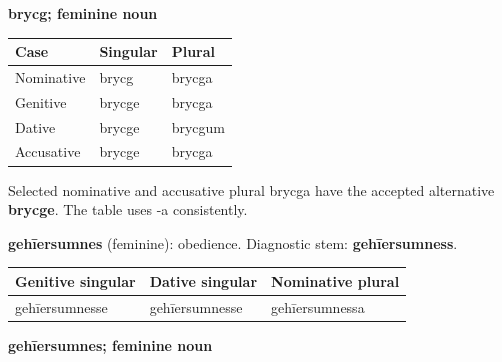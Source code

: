 \textbf{brycg; feminine noun}

\par\begingroup
\fontsize{10.5}{13.2}\selectfont
\setlength{\LTleft}{0pt}\setlength{\LTright}{\fill}
\noindent
\begin{tabular}{@{}>{\raggedright\arraybackslash}p{39.46mm}>{\raggedright\arraybackslash}p{39.46mm}>{\raggedright\arraybackslash}p{39.46mm}@{}}
\toprule
\textbf{Case} & \textbf{Singular} & \textbf{Plural} \\
\midrule
Nominative & brycg & brycga \\
Genitive & brycge & brycga \\
Dative & brycge & brycgum \\
Accusative & brycge & brycga \\
\bottomrule
\end{tabular}
\par\endgroup

Selected nominative and accusative plural brycga have the accepted alternative \textbf{brycge}. The table uses -a consistently.

\textbf{gehīersumnes} (feminine): obedience. Diagnostic stem: \textbf{gehīersumness}.

\par\begingroup
\fontsize{10.5}{13.2}\selectfont
\setlength{\LTleft}{0pt}\setlength{\LTright}{\fill}
\noindent
\begin{tabular}{@{}>{\raggedright\arraybackslash}p{40.25mm}>{\raggedright\arraybackslash}p{37.89mm}>{\raggedright\arraybackslash}p{40.25mm}@{}}
\toprule
\textbf{Genitive singular} & \textbf{Dative singular} & \textbf{Nominative plural} \\
\midrule
gehīersumnesse & gehīersumnesse & gehīersumnessa \\
\bottomrule
\end{tabular}
\par\endgroup

\textbf{gehīersumnes; feminine noun}

